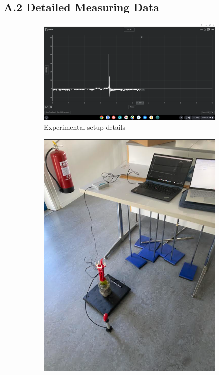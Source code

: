 \documentclass[12pt,a4paper]{article}
\begin{document}
\subsection{A.2 Detailed Measuring Data}

\begin{figure}[H]
\centering
\begin{subfigure}{0.45\textwidth}
    \centering
    \includegraphics[width=\textwidth]{measering apendix.png}
    \caption{Experimental setup details}
    \label{fig:setup_measurements_appendix}
\end{subfigure}
\hfill
\begin{subfigure}{0.45\textwidth}
    \centering
    \includegraphics[width=\textwidth]{measuring data appendix.png}

\end{subfigure}
\end{figure}
\end{document}
